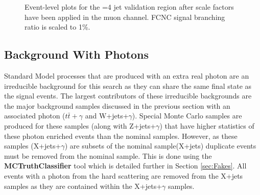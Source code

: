 \begin{figure}[h!]
\hfil 
{}
\caption{Event-level plots for the =4 jet validation region after scale factors have been applied in the muon channel.  FCNC signal branching ratio is scaled to 1\%.}
\label{fig:VR3mujpostscale}
\end{figure}



\subsection{Background With Photons}
\label{sec:BKGPho}

Standard Model processes that are produced with an extra real photon are an irreducible background for this search as they can share the same final state as the signal events.  The largest contributors of these irreducible backgrounds are the major background samples discussed in the previous section with an associated photon ($t\bar{t}+\gamma$ and W+jets+$\gamma$).  Special Monte Carlo samples are produced for these samples (along with Z+jets+$\gamma$) that have higher statistics of these photon enriched events than the nominal samples.  However, as these samples (X+jets+$\gamma$) are subsets of the nominal sample(X+jets) duplicate events must be removed from the nominal sample.  This is done using the \textbf{MCTruthClassifier} tool which is detailed further in Section \ref{sec:Fakes}.  All events with a photon from the hard scattering are removed from the X+jets samples as they are contained within the X+jets+$\gamma$ samples.
